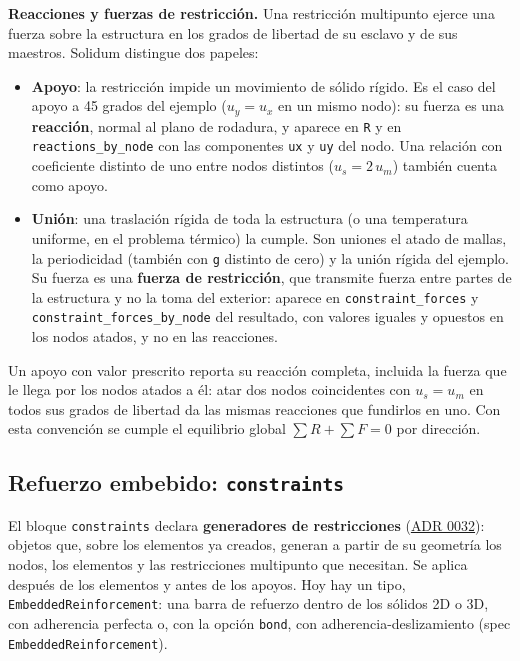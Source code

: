 \documentclass[11pt,oneside]{report}
\begin{document}
\textbf{Reacciones y fuerzas de restricción.} Una restricción multipunto ejerce una fuerza sobre la estructura en los grados de libertad de su esclavo y de sus maestros. Solidum distingue dos papeles:

\begin{itemize}
  \item \textbf{Apoyo}: la restricción impide un movimiento de sólido rígido. Es el caso del apoyo a 45 grados del ejemplo ($u_y = u_x$ en un mismo nodo): su fuerza es una \textbf{reacción}, normal al plano de rodadura, y aparece en \texttt{R} y en \texttt{reactions\_\allowbreak{}by\_\allowbreak{}node} con las componentes \texttt{ux} y \texttt{uy} del nodo. Una relación con coeficiente distinto de uno entre nodos distintos ($u_s = 2\,u_m$) también cuenta como apoyo.
  \item \textbf{Unión}: una traslación rígida de toda la estructura (o una temperatura uniforme, en el problema térmico) la cumple. Son uniones el atado de mallas, la periodicidad (también con \texttt{g} distinto de cero) y la unión rígida del ejemplo. Su fuerza es una \textbf{fuerza de restricción}, que transmite fuerza entre partes de la estructura y no la toma del exterior: aparece en \texttt{constraint\_\allowbreak{}forces} y \texttt{constraint\_\allowbreak{}forces\_\allowbreak{}by\_\allowbreak{}node} del resultado, con valores iguales y opuestos en los nodos atados, y no en las reacciones.
\end{itemize}

Un apoyo con valor prescrito reporta su reacción completa, incluida la fuerza que le llega por los nodos atados a él: atar dos nodos coincidentes con $u_s = u_m$ en todos sus grados de libertad da las mismas reacciones que fundirlos en uno. Con esta convención se cumple el equilibrio global $\sum R + \sum F = 0$ por dirección.

\subsection{Refuerzo embebido: \texttt{constraints}}

El bloque \texttt{constraints} declara \textbf{generadores de restricciones} (\href{https://github.com/jretamav/solidum-fem/blob/main/docs/adr/0032-restricciones-generadas-y-refuerzo-embebido.md}{ADR 0032}): objetos que, sobre los elementos ya creados, generan a partir de su geometría los nodos, los elementos y las restricciones multipunto que necesitan. Se aplica después de los elementos y antes de los apoyos. Hoy hay un tipo, \texttt{EmbeddedReinforcement}: una barra de refuerzo dentro de los sólidos 2D o 3D, con adherencia perfecta o, con la opción \texttt{bond}, con adherencia-deslizamiento (spec \texttt{EmbeddedReinforcement}).
\end{document}
